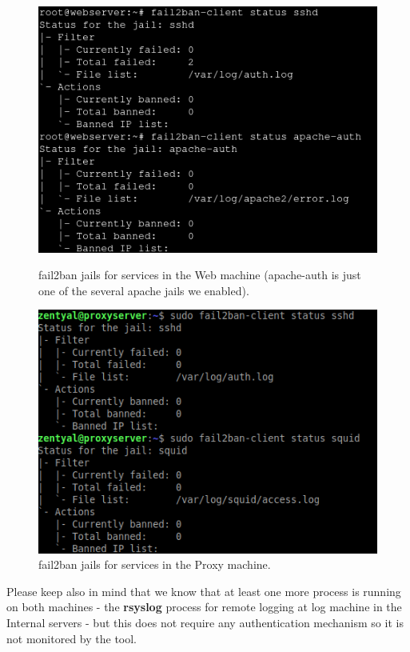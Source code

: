 \begin{figure}[!htb]
\centering
\begin{minipage}{.5\textwidth}
  \centering
  \includegraphics[width=1\textwidth]{fail2banWeb.png}
  \caption[a]{fail2ban jails for services in the Web machine (apache-auth is just one of the several apache jails we enabled).}\label{fig:1}
\end{minipage}%
\begin{minipage}{.5\textwidth}
  \centering
  \includegraphics[width=1\textwidth]{fail2banProxy.png}
  \caption[a]{fail2ban jails for services in the Proxy machine.}\label{fig:2}
\end{minipage}%
\end{figure}

Please keep also in mind that we know that at least one more process is running on both machines - the \textbf{rsyslog} process for remote logging at log machine in the Internal servers - but this does not require any authentication mechanism so it is not monitored by the tool.
